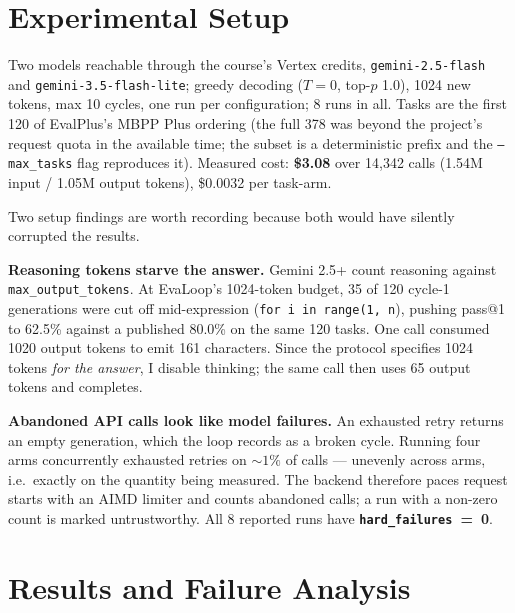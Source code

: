 \documentclass[10pt]{article}
\newcommand{\code}[1]{\texttt{\small #1}}
\begin{document}
\section{Experimental Setup}

Two models reachable through the course's Vertex credits,
\code{gemini-2.5-flash} and \code{gemini-3.5-flash-lite}; greedy decoding
($T{=}0$, top-$p$ 1.0), 1024 new tokens, max 10 cycles, one run per
configuration; 8 runs in all. Tasks are the first 120 of EvalPlus's MBPP Plus
ordering (the full 378 was beyond the project's request quota in the available
time; the subset is a deterministic prefix and the \code{--max\_tasks} flag
reproduces it). Measured cost: \textbf{\$3.08} over 14{,}342 calls (1.54M input
/ 1.05M output tokens), \$0.0032 per task-arm.

Two setup findings are worth recording because both would have silently
corrupted the results.

\textbf{Reasoning tokens starve the answer.} Gemini 2.5+ count reasoning
against \code{max\_output\_tokens}. At EvaLoop's 1024-token budget, 35 of 120
cycle-1 generations were cut off mid-expression (\code{for i in range(1, n}),
pushing pass@1 to 62.5\% against a published 80.0\% on the same 120 tasks. One
call consumed 1020 output tokens to emit 161 characters. Since the protocol
specifies 1024 tokens \emph{for the answer}, I disable thinking; the same call
then uses 65 output tokens and completes.

\textbf{Abandoned API calls look like model failures.} An exhausted retry
returns an empty generation, which the loop records as a broken cycle. Running
four arms concurrently exhausted retries on ${\sim}1\%$ of calls --- unevenly
across arms, i.e.\ exactly on the quantity being measured. The backend therefore
paces request starts with an AIMD limiter and counts abandoned calls; a run
with a non-zero count is marked untrustworthy. All 8 reported runs have
\textbf{\code{hard\_failures}~=~0}.

\section{Results and Failure Analysis}
\end{document}
